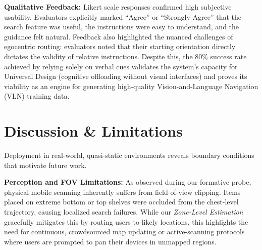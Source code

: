 \documentclass[sigconf,anonymous,review]{acmart}
\begin{document}
\textbf{Qualitative Feedback:} Likert scale responses confirmed high subjective usability. Evaluators explicitly marked ``Agree'' or ``Strongly Agree'' that the search feature was useful, the instructions were easy to understand, and the guidance felt natural. Feedback also highlighted the nuanced challenges of egocentric routing: evaluators noted that their starting orientation directly dictates the validity of relative instructions. Despite this, the 80\% success rate achieved by relying solely on verbal cues validates the system's capacity for Universal Design (cognitive offloading without visual interfaces) and proves its viability as an engine for generating high-quality Vision-and-Language Navigation (VLN) training data.



\section{Discussion \& Limitations}

Deployment in real-world, quasi-static environments reveals boundary conditions that motivate future work.

\textbf{Perception and FOV Limitations:} As observed during our formative probe, physical mobile scanning inherently suffers from field-of-view clipping. Items placed on extreme bottom or top shelves were occluded from the chest-level trajectory, causing localized search failures. While our \emph{Zone-Level Estimation} gracefully mitigates this by routing users to likely locations, this highlights the need for continuous, crowdsourced map updating or active-scanning protocols where users are prompted to pan their devices in unmapped regions.
\end{document}
